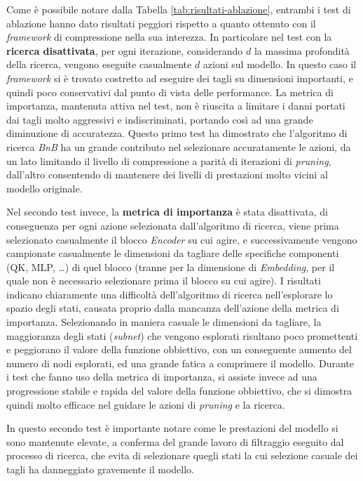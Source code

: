 Come è possibile notare dalla Tabella \ref{tab:risultati-ablazione}, entrambi i test di ablazione hanno dato risultati
peggiori rispetto a quanto ottenuto con il \textit{framework} di compressione
nella sua interezza. In particolare nel test con la \textbf{ricerca
    disattivata}, per ogni iterazione, considerando $d$ la massima profondità della
ricerca, vengono eseguite casualmente $d$ azioni sul modello. In questo caso il
\textit{framework} si è trovato costretto ad eseguire dei tagli su dimensioni
importanti, e quindi poco conservativi dal punto di vista delle performance. La
metrica di importanza, mantenuta attiva nel test, non è riuscita a limitare i
danni portati dai tagli molto aggressivi e indiscriminati, portando così ad una
grande diminuzione di accuratezza. Questo primo test ha dimostrato che
l'algoritmo di ricerca \textit{BnB} ha un grande contributo nel selezionare
accuratamente le azioni, da un lato limitando il livello di compressione a
parità di iterazioni di \textit{pruning}, dall'altro consentendo di mantenere
dei livelli di prestazioni molto vicini al modello originale. \par
Nel secondo test invece, la \textbf{metrica di importanza} è stata disattivata,
di conseguenza per ogni azione selezionata dall'algoritmo di ricerca, viene
prima selezionato casualmente il blocco \textit{Encoder} su cui agire, e
successivamente vengono campionate casualmente le dimensioni da tagliare delle
specifiche componenti (QK, MLP, \dots) di quel blocco (tranne per la dimensione
di \textit{Embedding}, per il quale non è necessario selezionare prima il
blocco su cui agire). I risultati indicano chiaramente una difficoltà
dell'algoritmo di ricerca nell'esplorare lo spazio degli stati, causata proprio
dalla mancanza dell'azione della metrica di importanza. Selezionando in maniera
casuale le dimensioni da tagliare, la maggioranza degli stati (\textit{subnet})
che vengono esplorati risultano poco promettenti e peggiorano il valore della
funzione obbiettivo, con un conseguente aumento del numero di nodi esplorati,
ed una grande fatica a comprimere il modello. Durante i test che fanno uso
della metrica di importanza, si assiste invece ad una progressione stabile e
rapida del valore della funzione obbiettivo, che si dimostra quindi molto
efficace nel guidare le azioni di \textit{pruning} e la ricerca. \par In questo secondo test è importante notare come le prestazioni del modello si
sono mantenute elevate, a conferma del grande lavoro di filtraggio eseguito dal
processo di ricerca, che evita di selezionare quegli stati la cui selezione
casuale dei tagli ha danneggiato gravemente il modello.

